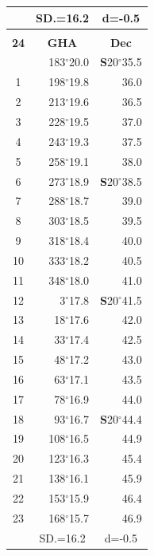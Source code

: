 \documentclass[10pt, a4paper]{report}
\begin{document}
\begin{scriptsize}
\begin{tabular*}{0.2\textwidth}[t]{@{\extracolsep{\fill}}|c|rr|}
\hline
\rule{0pt}{2.4ex} & \multicolumn{1}{c}{SD.=16.2} & \multicolumn{1}{c|}{d=-0.5}\\
\hline
\multicolumn{1}{c}{}\\[-0.5ex]\hline
\multicolumn{1}{|c|}{\rule{0pt}{2.6ex}\textbf{24}} & \multicolumn{1}{c}{\textbf{GHA}} & \multicolumn{1}{c|}{\textbf{Dec}}\\
\hline\rule{0pt}{2.6ex}\noindent
0 & 183$^\circ$20.0 & \textbf{S}20$^\circ$35.5\\
1 & 198$^\circ$19.8 & 36.0\\
2 & 213$^\circ$19.6 & 36.5\\
3 & 228$^\circ$19.5 & \raisebox{0.24ex}{\boldmath$\cdot$~\boldmath$\cdot$~~}37.0\\
4 & 243$^\circ$19.3 & 37.5\\
5 & 258$^\circ$19.1 & 38.0\\[2Pt]
6 & 273$^\circ$18.9 & \textbf{S}20$^\circ$38.5\\
7 & 288$^\circ$18.7 & 39.0\\
8 & 303$^\circ$18.5 & 39.5\\
9 & 318$^\circ$18.4 & \raisebox{0.24ex}{\boldmath$\cdot$~\boldmath$\cdot$~~}40.0\\
10 & 333$^\circ$18.2 & 40.5\\
11 & 348$^\circ$18.0 & 41.0\\[2Pt]
12 & 3$^\circ$17.8 & \textbf{S}20$^\circ$41.5\\
13 & 18$^\circ$17.6 & 42.0\\
14 & 33$^\circ$17.4 & 42.5\\
15 & 48$^\circ$17.2 & \raisebox{0.24ex}{\boldmath$\cdot$~\boldmath$\cdot$~~}43.0\\
16 & 63$^\circ$17.1 & 43.5\\
17 & 78$^\circ$16.9 & 44.0\\[2Pt]
18 & 93$^\circ$16.7 & \textbf{S}20$^\circ$44.4\\
19 & 108$^\circ$16.5 & 44.9\\
20 & 123$^\circ$16.3 & 45.4\\
21 & 138$^\circ$16.1 & \raisebox{0.24ex}{\boldmath$\cdot$~\boldmath$\cdot$~~}45.9\\
22 & 153$^\circ$15.9 & 46.4\\
23 & 168$^\circ$15.7 & 46.9\\
\hline
\rule{0pt}{2.4ex} & \multicolumn{1}{c}{SD.=16.2} & \multicolumn{1}{c|}{d=-0.5}\\
\hline
\end{tabular*}\noindent
\begin{tabular*}{0.2\textwidth}[t]{@{\extracolsep{\fill}}|c|rr|}

\end{tabular*}
\end{scriptsize}
\end{document}
